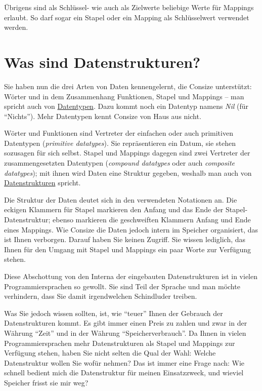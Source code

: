 Übrigens sind als Schlüssel- wie auch als Zielwerte beliebige Werte für Mappings erlaubt. So darf sogar ein Stapel oder ein Mapping als Schlüs\-sel\-wert verwendet werden.

\section{Was sind Datenstrukturen?}

Sie haben nun die drei Arten von Daten kennengelernt, die Consize unterstützt: Wörter und in dem Zusammenhang Funktionen, Stapel und Mappings -- man spricht auch von \href{http://de.wikipedia.org/wiki/Datentyp}{Datentypen}. Dazu kommt noch ein Datentyp namens \emph{Nil} (für "`Nichts"'). Mehr Datentypen kennt Consize von Haus aus nicht.

Wörter und Funktionen sind Vertreter der einfachen oder auch primitiven Datentypen (\emph{primitive datatypes}). Sie repräsentieren ein Datum, sie stehen sozusagen für sich selbst. Stapel und Mappings dagegen sind zwei Vertreter der zusammengesetzten Datentypen (\emph{compound datatypes} oder auch \emph{composite datatypes}); mit ihnen wird Daten eine Struktur gegeben, weshalb man auch von \href{http://de.wikipedia.org/wiki/Datenstruktur}{Datenstrukturen} spricht.

Die Struktur der Daten deutet sich in den verwendeten Notationen an. Die eckigen Klammern für Stapel markieren den Anfang und das Ende der Stapel-Datenstruktur; ebenso markieren die geschweiften Klammern Anfang und Ende eines Mappings. Wie Consize die Daten jedoch intern im Speicher organisiert, das ist Ihnen verborgen. Darauf haben Sie keinen Zugriff. Sie wissen lediglich, das Ihnen für den Umgang mit Stapel und Mappings ein paar Worte zur Verfügung stehen.

Diese Abschottung von den Interna der eingebauten Datenstrukturen ist in vielen Programmiersprachen so gewollt. Sie sind Teil der Sprache und man möchte verhindern, dass Sie damit irgendwelchen Schindluder treiben.

Was Sie jedoch wissen sollten, ist, wie "`teuer"' Ihnen der Gebrauch der Datenstrukturen kommt. Es gibt immer einen Preis zu zahlen und zwar in der Währung "`Zeit"' und in der Währung "`Speicherverbrauch"'. Da Ihnen in vielen Programmiersprachen mehr Datenstrukturen als Stapel und Mappings zur Verfügung stehen, haben Sie nicht selten die Qual der Wahl: Welche Datenstruktur wollen Sie wofür nehmen? Das ist immer eine Frage nach: Wie schnell bedient mich die Datenstruktur für meinen Einsatzzweck, und wieviel Speicher frisst sie mir weg?

